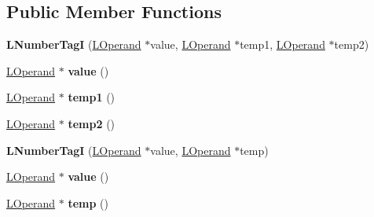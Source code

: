 \subsection*{Public Member Functions}
\begin{DoxyCompactItemize}
\item 
{\bfseries L\+Number\+TagI} (\hyperlink{classv8_1_1internal_1_1_l_operand}{L\+Operand} $\ast$value, \hyperlink{classv8_1_1internal_1_1_l_operand}{L\+Operand} $\ast$temp1, \hyperlink{classv8_1_1internal_1_1_l_operand}{L\+Operand} $\ast$temp2)\hypertarget{classv8_1_1internal_1_1_l_number_tag_i_a4454430c378e86af6c4da1c174621290}{}\label{classv8_1_1internal_1_1_l_number_tag_i_a4454430c378e86af6c4da1c174621290}

\item 
\hyperlink{classv8_1_1internal_1_1_l_operand}{L\+Operand} $\ast$ {\bfseries value} ()\hypertarget{classv8_1_1internal_1_1_l_number_tag_i_af1937f50e27c8665954070a538f640e4}{}\label{classv8_1_1internal_1_1_l_number_tag_i_af1937f50e27c8665954070a538f640e4}

\item 
\hyperlink{classv8_1_1internal_1_1_l_operand}{L\+Operand} $\ast$ {\bfseries temp1} ()\hypertarget{classv8_1_1internal_1_1_l_number_tag_i_a2fecebdcf5d9ce508e3fd3f24ee82850}{}\label{classv8_1_1internal_1_1_l_number_tag_i_a2fecebdcf5d9ce508e3fd3f24ee82850}

\item 
\hyperlink{classv8_1_1internal_1_1_l_operand}{L\+Operand} $\ast$ {\bfseries temp2} ()\hypertarget{classv8_1_1internal_1_1_l_number_tag_i_aaa03e3b699a9c03b971db41b85de0351}{}\label{classv8_1_1internal_1_1_l_number_tag_i_aaa03e3b699a9c03b971db41b85de0351}

\item 
{\bfseries L\+Number\+TagI} (\hyperlink{classv8_1_1internal_1_1_l_operand}{L\+Operand} $\ast$value, \hyperlink{classv8_1_1internal_1_1_l_operand}{L\+Operand} $\ast$temp)\hypertarget{classv8_1_1internal_1_1_l_number_tag_i_a453b9ce63c6b1642fbb8f451a8c78c76}{}\label{classv8_1_1internal_1_1_l_number_tag_i_a453b9ce63c6b1642fbb8f451a8c78c76}

\item 
\hyperlink{classv8_1_1internal_1_1_l_operand}{L\+Operand} $\ast$ {\bfseries value} ()\hypertarget{classv8_1_1internal_1_1_l_number_tag_i_af1937f50e27c8665954070a538f640e4}{}\label{classv8_1_1internal_1_1_l_number_tag_i_af1937f50e27c8665954070a538f640e4}

\item 
\hyperlink{classv8_1_1internal_1_1_l_operand}{L\+Operand} $\ast$ {\bfseries temp} ()\hypertarget{classv8_1_1internal_1_1_l_number_tag_i_aae73b5a6e9e61e27a58995ce48f6ddcc}{}\label{classv8_1_1internal_1_1_l_number_tag_i_aae73b5a6e9e61e27a58995ce48f6ddcc}


\end{DoxyCompactItemize}
